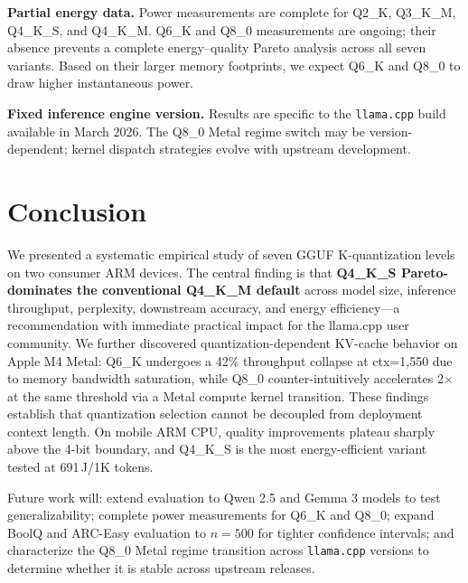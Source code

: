 \documentclass{article}
\begin{document}
\textbf{Partial energy data.} Power measurements are complete for Q2\_K, Q3\_K\_M, Q4\_K\_S, and Q4\_K\_M. Q6\_K and Q8\_0 measurements are ongoing; their absence prevents a complete energy--quality Pareto analysis across all seven variants. Based on their larger memory footprints, we expect Q6\_K and Q8\_0 to draw higher instantaneous power.

\textbf{Fixed inference engine version.} Results are specific to the \texttt{llama.cpp} build available in March 2026. The Q8\_0 Metal regime switch may be version-dependent; kernel dispatch strategies evolve with upstream development.

\section{Conclusion}
\label{sec:conclusion}

We presented a systematic empirical study of seven GGUF K-quantization levels on two consumer ARM devices. The central finding is that \textbf{Q4\_K\_S Pareto-dominates the conventional Q4\_K\_M default} across model size, inference throughput, perplexity, downstream accuracy, and energy efficiency—a recommendation with immediate practical impact for the llama.cpp user community. We further discovered quantization-dependent KV-cache behavior on Apple M4 Metal: Q6\_K undergoes a 42\% throughput collapse at ctx=1,550 due to memory bandwidth saturation, while Q8\_0 counter-intuitively accelerates 2$\times$ at the same threshold via a Metal compute kernel transition. These findings establish that quantization selection cannot be decoupled from deployment context length. On mobile ARM CPU, quality improvements plateau sharply above the 4-bit boundary, and Q4\_K\_S is the most energy-efficient variant tested at 691\,J/1K tokens.

Future work will: extend evaluation to Qwen 2.5 and Gemma 3 models to test generalizability; complete power measurements for Q6\_K and Q8\_0; expand BoolQ and ARC-Easy evaluation to $n=500$ for tighter confidence intervals; and characterize the Q8\_0 Metal regime transition across \texttt{llama.cpp} versions to determine whether it is stable across upstream releases.
\end{document}
